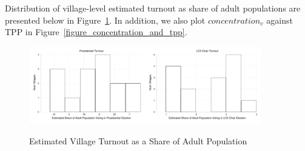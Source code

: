 \documentclass[12pt]{article}
\begin{document}
\begin{appendix}
Distribution of village-level estimated turnout as share of adult populations are presented below in Figure~\ref{figure_adultturnout}. In addition, we also plot $concentration_{v}$ against TPP in Figure~\ref{figure_concentration_and_tpp}.

\begin{figure}[h!]
  \centering
  \caption{Estimated Village Turnout as a Share of Adult Population}\label{figure_adultturnout}
\includegraphics[width=0.45\textwidth]{../3_results/presidential_turnout_hist.pdf}\includegraphics[width=0.45\textwidth]{../3_results/lc5chair_turnout_hist.pdf}
\end{figure}




\end{appendix}
\end{document}
